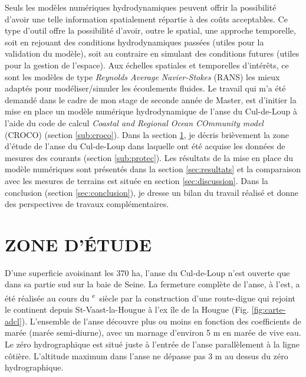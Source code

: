\documentclass[10pt,a4paper,titlepage]{article}
\def\siecle#1{\textsc{\romannumeral #1}\textsuperscript{e}~siècle}
\begin{document}
    Seuls les modèles numériques hydrodynamiques peuvent offrir la possibilité d'avoir une telle information spatialement répartie à des coûts acceptables. Ce type d'outil offre la possibilité d'avoir, outre le spatial, une approche temporelle, soit en rejouant des conditions hydrodynamiques passées (utiles pour la validation du modèle), soit au contraire en simulant des conditions futures (utiles pour la gestion de l'espace). Aux échelles spatiales et temporelles d'intérêts, ce sont les modèles de type \textit{Reynolds Average Navier-Stokes} (RANS) les mieux adaptés pour modéliser/simuler les écoulements fluides.
    Le travail qui m'a été demandé dans le cadre de mon stage de seconde année de Master, est d'initier la mise en place un modèle numérique hydrodynamique de l'anse du Cul-de-Loup à l'aide du code de calcul \textit{Coastal and Regional Ocean COmmunity model} (CROCO) (section \ref{sub:croco}). Dans la section \ref{sec:adcl}, je décris brièvement la zone d'étude de l'anse du Cul-de-Loup dans laquelle ont été acquise les données de mesures des courants (section \ref{sub:protec}). Les résultats de la mise en place du modèle numériques sont présentés dans la section \ref{sec:resultats} et la comparaison avec les mesures de terrains est située en section \ref{sec:discussion}. Dans la conclusion (section \ref{sec:conclusion}), je dresse un bilan du travail réalisé et donne des perspectives de travaux complémentaires.

    \newpage

    \section{ZONE D'ÉTUDE}
    \label{sec:adcl}

    D'une superficie avoisinant les 370 ha, l'anse du Cul-de-Loup n'est ouverte que dans sa partie sud sur la baie de Seine. La fermeture complète de l'anse, à l'est, a été réalisée au cours du \siecle{17} par la construction d'une route-digue qui rejoint le continent depuis St-Vaast-la-Hougue à l'ex île de la Hougue (Fig. \ref{fig:carte-adcl}). L'ensemble de l'anse découvre plus ou moins en fonction des coefficients de marée (marée semi-diurne), avec un marnage d'environ 5 m en marée de vive eau. Le zéro hydrographique est situé juste à l'entrée de l'anse parallèlement à la ligne côtière. L'altitude maximum dans l'anse ne dépasse pas 3 m au dessus du zéro hydrographique.
\end{document}
